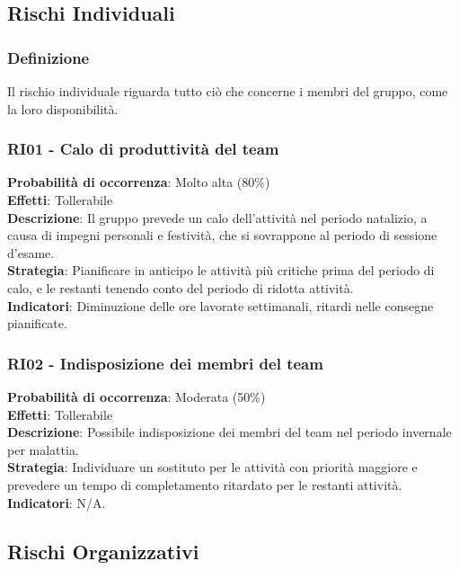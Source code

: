 \documentclass[a4paper,12pt]{article}
\begin{document}
\subsection{Rischi Individuali}

\subsubsection{Definizione}
Il rischio individuale riguarda tutto ciò che concerne i membri del gruppo, come la loro disponibilità.

\subsubsection{RI01 - Calo di produttività del team}
\label{RI01}
\textbf{Probabilità di occorrenza}: Molto alta (80\%)\\
\textbf{Effetti}: Tollerabile\\
\textbf{Descrizione}: Il gruppo prevede un calo dell'attività nel periodo natalizio, a causa di impegni personali e festività, che si sovrappone al periodo di sessione d'esame.\\
\textbf{Strategia}: Pianificare in anticipo le attività più critiche prima del periodo di calo, e le restanti tenendo conto del periodo di ridotta attività.\\
\textbf{Indicatori}: Diminuzione delle ore lavorate settimanali, ritardi nelle consegne pianificate.

\subsubsection{RI02 - Indisposizione dei membri del team}
\label{RI02}
\textbf{Probabilità di occorrenza}: Moderata (50\%)\\
\textbf{Effetti}: Tollerabile\\
\textbf{Descrizione}: Possibile indisposizione dei membri del team nel periodo invernale per malattia.\\
\textbf{Strategia}: Individuare un sostituto per le attività con priorità maggiore e prevedere un tempo di completamento ritardato per le restanti attività.\\
\textbf{Indicatori}: N/A.





\subsection{Rischi Organizzativi}
\end{document}
